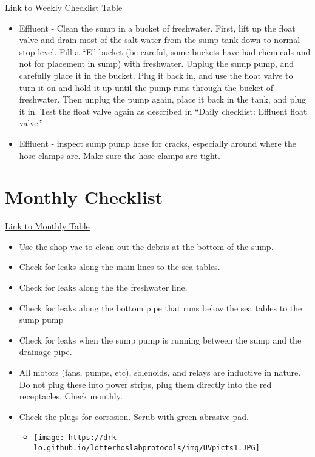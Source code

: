 \documentclass[
  letterpaper,
  DIV=11,
  numbers=noendperiod]{scrreprt}
\providecommand{\tightlist}{%
  \setlength{\itemsep}{0pt}\setlength{\parskip}{0pt}}\usepackage{longtable,booktabs,array}
\begin{document}

\href{https://docs.google.com/spreadsheets/d/1oQnhrPk-GJYOvP48skjc4ehimgx4G3M1Ne0vrJx371c/edit\#gid=1794014838}{Link
to Weekly Checklist Table}

\begin{itemize}
\item
  Effluent - Clean the sump in a bucket of freshwater. First, lift up
  the float valve and drain most of the salt water from the sump tank
  down to normal stop level. Fill a ``E'' bucket (be careful, some
  buckets have had chemicals and not for placement in sump) with
  freshwater. Unplug the sump pump, and carefully place it in the
  bucket. Plug it back in, and use the float valve to turn it on and
  hold it up until the pump runs through the bucket of freshwater. Then
  unplug the pump again, place it back in the tank, and plug it in. Test
  the float valve again as described in ``Daily checklist: Effluent
  float valve.''
\item
  Effluent - inspect sump pump hose for cracks, especially around where
  the hose clamps are. Make sure the hose clamps are tight.
\end{itemize}

\hypertarget{monthly-checklist}{%
\section*{\texorpdfstring{\textbf{Monthly
Checklist}}{Monthly Checklist}}\label{monthly-checklist}}


\href{https://docs.google.com/spreadsheets/d/1oQnhrPk-GJYOvP48skjc4ehimgx4G3M1Ne0vrJx371c/edit\#gid=626032260}{Link
to Monthly Table}

\begin{itemize}
\item
  Use the shop vac to clean out the debris at the bottom of the sump.
\item
  Check for leaks along the main lines to the sea tables.
\item
  Check for leaks along the the freshwater line.
\item
  Check for leaks along the bottom pipe that runs below the sea tables
  to the sump pump
\item
  Check for leaks when the sump pump is running between the sump and the
  drainage pipe.
\item
  All motors (fans, pumps, etc), solenoids, and relays are inductive in
  nature. Do not plug these into power strips, plug them directly into
  the red receptacles. Check monthly.
\item
  Check the plugs for corrosion. Scrub with green abrasive pad.

  \begin{itemize}
  \tightlist
  \item
    \texttt{[image: https://drk-lo.github.io/lotterhoslabprotocols/img/UVpicts1.JPG]}
  \end{itemize}
\end{itemize}
\end{document}
